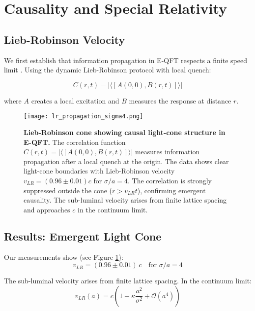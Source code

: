 \documentclass[11pt,a4paper]{article}
\begin{document}
\section{Causality and Special Relativity}

\subsection{Lieb-Robinson Velocity}

We first establish that information propagation in E-QFT respects a finite speed limit \cite{Lieb1972,Hastings2004}. Using the dynamic Lieb-Robinson protocol with local quench:

\begin{equation}
C(r,t) = |\langle [A(0,0), B(r,t)] \rangle|
\end{equation}

where $A$ creates a local excitation and $B$ measures the response at distance $r$.

\begin{figure}[H]
\centering
\texttt{[image: lr\_propagation\_sigma4.png]}
\caption{\textbf{Lieb-Robinson cone showing causal light-cone structure in E-QFT.} The correlation function $C(r,t) = |\langle [A(0,0), B(r,t)] \rangle|$ measures information propagation after a local quench at the origin. The data shows clear light-cone boundaries with Lieb-Robinson velocity $v_{LR} = (0.96 \pm 0.01)c$ for $\sigma/a = 4$. The correlation is strongly suppressed outside the cone ($r > v_{LR}t$), confirming emergent causality. The sub-luminal velocity arises from finite lattice spacing and approaches $c$ in the continuum limit.}
\label{fig:lieb_robinson}
\end{figure}

\subsection{Results: Emergent Light Cone}

Our measurements show (see Figure \ref{fig:lieb_robinson}):
\begin{equation}
v_{LR} = (0.96 \pm 0.01)\,c \quad \text{for } \sigma/a = 4
\end{equation}

The sub-luminal velocity arises from finite lattice spacing. In the continuum limit:
\begin{equation}
v_{LR}(a) = c\left(1 - \kappa \frac{a^2}{\sigma^2} + \mathcal{O}(a^4)\right)
\end{equation}
\end{document}
